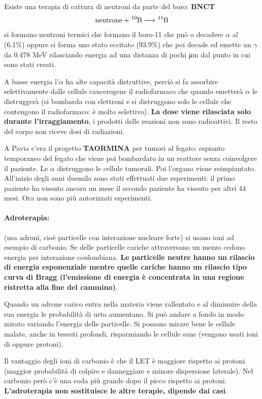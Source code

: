 \documentclass[a4paper,11pt,twoside,openany]{book}
\theoremstyle{definition}
\theoremstyle{plain}
\theoremstyle{plain}
\theoremstyle{definition}
\begin{document}
Esiste una terapia di cattura di neutroni da parte del boro: \textbf{BNCT} $$\textrm{neutrone} + \ce{^10B} \longrightarrow \ce{^11B}$$ si formano neutroni termici che formano il boro-11 che può o decadere $\alpha$ al (6.1\%) oppure si forma uno stato eccitato (93.9\%) che poi decade ed emette un $\gamma$ da 0.478 MeV rilasciando energia ad una distanza di pochi \si{\micro m} dal punto in cui sono stati creati.

A basse energia l'$\alpha$ ha alte capacità distruttive, perciò si fa assorbire selettivamente dalle cellule cancerogene il radiofarmaco che quando emetterà $\alpha$ le distruggerà (si bombarda con elettroni e si distruggono solo le cellule che contengono il radiofarmaco: è molto selettivo). \textbf{La dose viene rilasciata solo durante l'irraggiamento}, i prodotti delle reazioni non sono radioattivi. Il resto del corpo non riceve dosi di radiazioni.

A Pavia c'era il progetto \textbf{TAORMINA} per tumori al fegato: espianto temporaneo del fegato che viene poi bombardato in un reattore senza coinvolgere il paziente. Le $\alpha$ distruggono le cellule tumorali. Poi l'organo viene reimpiantato. All'inizio degli anni duemila sono stati effettuati due esperimenti: il primo paziente ha vissuto ancora un mese il secondo paziente ha vissuto per altri 44 mesi. Ora non sono più autorizzati esperimenti.

\paragraph{Adroterapia:} (usa adroni, cioè particelle con interazione nucleare forte) si usano ioni ad esempio di carbonio. Se delle particelle cariche attraversano un mezzo cedono energia per interazione coulombiana. \textbf{Le particelle neutre hanno un rilascio di energia esponenziale mentre quelle cariche hanno un rilascio tipo curva di Bragg (l'emissione di energia è concentrata in una regione ristretta alla fine del cammino)}.

Quando un adrone carico entra nella materia viene rallentato e al diminuire della sua energia le probabilità di urto aumentano. Si può andare a fondo in modo mirato variando l'energia delle particelle. Si possono mirare bene le cellule malate, anche in tessuti profondi, risparmiando le cellule sane (vengono usati ioni di  oppure protoni).

Il vantaggio degli ioni di carbonio è che il LET è maggiore rispetto ai protoni (maggior probabilità di colpire e danneggiare e minore dispersione laterale). Nel carbonio però c'è una coda più grande dopo il picco rispetto ai protoni. \textbf{L'adroterapia non sostituisce le altre terapie, dipende dai casi}.
\end{document}
